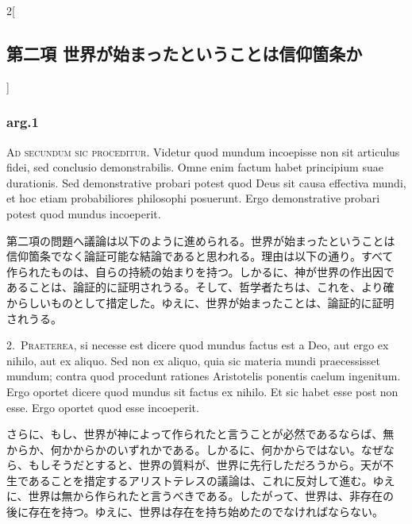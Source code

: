 \documentclass[paper=a4paper,fontsize=10pt,jafontsize=9pt,titlepage]{jlreq}
\begin{document}
\begin{paracol}{2}[\subsection{第二項 世界が始まったということは信仰箇条か}]

\subsubsection{arg.1}

{\LARGE A}{\scshape d secundum sic proceditur}. Videtur quod mundum
 incoepisse non sit articulus fidei, sed conclusio demonstrabilis. Omne
 enim factum habet principium suae durationis. Sed demonstrative probari
 potest quod Deus sit causa effectiva mundi, et hoc etiam probabiliores
 philosophi posuerunt. Ergo demonstrative probari potest quod mundus
 incoeperit.


\switchcolumn


第二項の問題へ議論は以下のように進められる。世界が始まったということは
信仰箇条でなく論証可能な結論であると思われる。理由は以下の通り。すべて
作られたものは、自らの持続の始まりを持つ。しかるに、神が世界の作出因で
あることは、論証的に証明されうる。そして、哲学者たちは、これを、より確
からしいものとして措定した。ゆえに、世界が始まったことは、論証的に証明
されうる。




2.~{\scshape Praeterea}, si necesse est dicere quod mundus factus est a Deo,
 aut ergo ex nihilo, aut ex aliquo. Sed non ex aliquo, quia sic materia
 mundi praecessisset mundum; contra quod procedunt rationes Aristotelis
 ponentis caelum ingenitum. Ergo oportet dicere quod mundus sit factus
 ex nihilo. Et sic habet esse post non esse. Ergo oportet quod esse
 incoeperit.


\switchcolumn


さらに、もし、世界が神によって作られたと言うことが必然であるならば、無
からか、何かからかのいずれかである。しかるに、何かからではない。なぜな
ら、もしそうだとすると、世界の質料が、世界に先行しただろうから。天が不
生であることを措定するアリストテレスの議論は、これに反対して進む。ゆえ
に、世界は無から作られたと言うべきである。したがって、世界は、非存在の
後に存在を持つ。ゆえに、世界は存在を持ち始めたのでなければならない。





\end{paracol}
\end{document}

